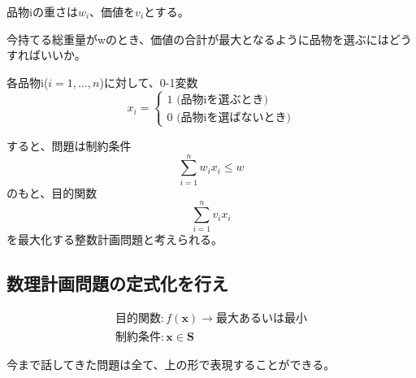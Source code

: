 \documentclass[9pt]{ltjsreport}
\begin{document}
品物iの重さは$w_i$、価値を$v_i$とする。

今持てる総重量がwのとき、価値の合計が最大となるように品物を選ぶにはどうすればいいか。

\hrulefill

各品物i($i=1,\dots,n$)に対して、0-1変数
\begin{equation}
    x_i=
    \begin{cases}
        1 \text{ (品物iを選ぶとき)}\\
        0 \text{ (品物iを選ばないとき)}
    \end{cases}
\end{equation}

すると、問題は制約条件
\begin{equation}
    \sum_{i=1}^n w_ix_i\le w 
\end{equation}
のもと、目的関数
\begin{equation}
    \sum_{i=1}^n v_ix_i
\end{equation}
を最大化する整数計画問題と考えられる。

\subsection{数理計画問題の定式化を行え}
\begin{tcolorbox}[title=数理計画問題]
\begin{gather*}
    \text{目的関数}:f(\bm{x}) \longrightarrow \text{最大あるいは最小}\\
    \text{制約条件}:\bm{x}\in \bm{S}
\end{gather*}
\end{tcolorbox}
今まで話してきた問題は全て、上の形で表現することができる。
\end{document}
